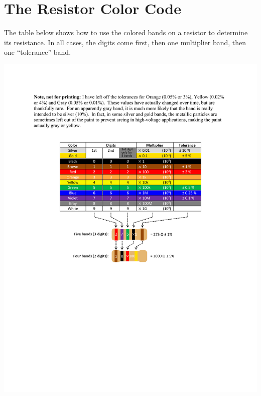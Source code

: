 \section{The Resistor Color Code}
\label{resistor_code}

The table below shows how to use the colored bands on a resistor to determine its resistance.  In all cases, the digits come first, then one multiplier band, then one ``tolerance'' band. 


{\centering \includegraphics{appendices/resistor_code/resistor_table.pdf} \par}


